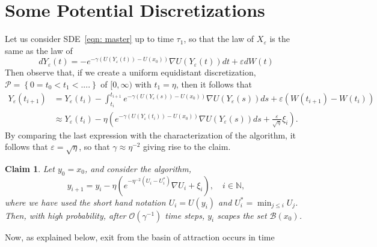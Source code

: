 \documentclass{amsproc}
\newtheorem{claim}[theorem]{Claim}
\newcommand{\eps}{\varepsilon}
\newcommand{\x}{X_\eps}
\newcommand{\y}{Y_\eps}
\begin{document}
\section{Some Potential Discretizations}
Let us consider SDE~\eqref{eqn: master} up to time $\tau_1$, so that the law of $\x$ is the same as the law of 
\[
d\y(t) = - e^{ - \gamma \left(  U(\y(t)) - U(x_0) \right )} \nabla U(\y(t)) dt + \eps dW(t)
\]
Then observe that, if we create a uniform equidistant discretization, $\mathcal{P}=\left\{ 0=t_0 < t_1 <.... \right \}$ of $[0,\infty)$ with $t_1 = \eta$, then it follows that 
\begin{align*}
\y(t_{i+1})  &= \y(t_i) - \int_{t_i}^{t_{i+1}}   e^{ - \gamma \left(  U(\y(s)) - U(x_0) \right )} \nabla U(\y(s))ds + \eps \left( W(t_{i+1}) - W(t_i) \right) \\
&\approx \y(t_i) - \eta \left(   e^{ - \gamma \left(  U(\y(t_i)) - U(x_0) \right )} \nabla U(\y(s))ds + \frac{\eps}{\sqrt{\eta}} \xi_i \right).
\end{align*}
By comparing the last expression with the characterization of the algorithm, it follows that $\eps = \sqrt{\eta}$, so that $\gamma \approx \eta^{-2}$ giving rise to the claim. 
\begin{claim}
Let $y_0 = x_0$, and consider the algorithm,  
\[
y_{i+1} = y_i  - \eta \left( e^{ -\eta^{-2} \left( U_i - U^*_i  \right) } \nabla U_i + \xi_i \right), \quad i \in \mathbb{N},
\]
where we have used the short hand notation $U_i = U(y_i)$ and $U^*_i = \min_{ j \leq i } U_j $. Then, with high probability, after $\mathcal{O}(\gamma^{-1})$ time steps, $y_i$ scapes the set $\mathcal{B}(x_0)$.
\end{claim}
Now, as explained below, exit from the basin of attraction occurs in time
\end{document}
